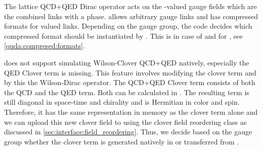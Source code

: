 

The lattice QCD+QED Dirac operator acts on the -valued gauge fields which are the combined  links with a  phase.
\Quda allows arbitrary gauge links and has compressed formats for  valued links.
Depending on the gauge group, the code decides which compressed format should be instantiated by \quda.
This is  in case of  and  for , see \cref{quda:compresed:formats}.

\Quda does not support simulating Wilson-Clover QCD+QED natively, especially the QED Clover term is missing.
This feature involves modifying the clover term and by this the Wilson-Dirac operator.
The QCD+QED Clover term consists of both the QCD  and the QED  term.
Both can be calculated in \openqxd.
The resulting term is still diagonal in space-time and chirality and is Hermitian in color and spin.
Therefore, it has the same representation in memory as the  clover term alone and we can upload this new clover field to \quda using the clover field reordering class as discussed in \cref{sec:interface:field_reordering}.
Thus, we decide based on the gauge group whether the clover term is generated natively in \quda or transferred from \openqxd.

